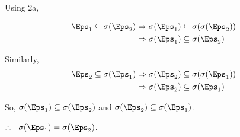 Using 2a,

\begin{align*}
  \Eps_1 \subseteq \sigma(\Eps_2) &\Rightarrow \sigma(\Eps_1) \subseteq \sigma(\sigma(\Eps_2)) \\
  &\Rightarrow \sigma(\Eps_1) \subseteq \sigma(\Eps_2) \\
\end{align*}

Similarly, 
\begin{align*}
  \Eps_2 \subseteq \sigma(\Eps_1) &\Rightarrow \sigma(\Eps_2) \subseteq \sigma(\sigma(\Eps_1)) \\
  &\Rightarrow \sigma(\Eps_2) \subseteq \sigma(\Eps_1) \\
\end{align*}

So, $\sigma(\Eps_1) \subseteq \sigma(\Eps_2)$ and 
$\sigma(\Eps_2) \subseteq \sigma(\Eps_1)$.

$\therefore~~ \sigma(\Eps_1) = \sigma(\Eps_2)$.
